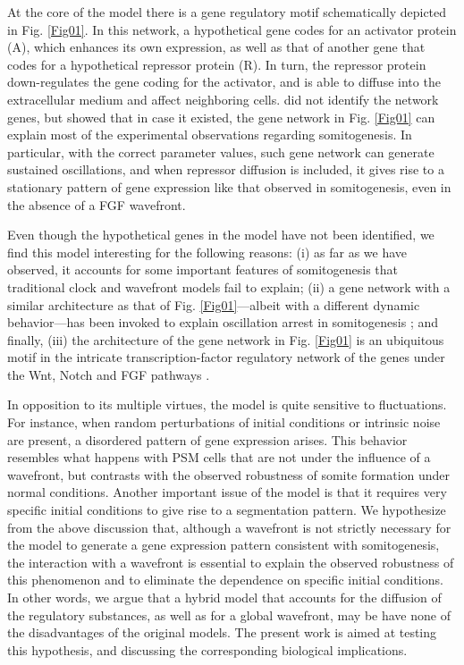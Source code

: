 \documentclass[11pt]{article}
\begin{document}
	At the core of the \citeauthor{Cotterell2015} model there is a gene regulatory
	motif schematically depicted in Fig. \ref{Fig01}. In this network, a
	hypothetical gene codes for an activator protein (A), which enhances its own
	expression, as well as that of another gene that codes for a hypothetical
	repressor protein (R). In turn, the repressor protein down-regulates the gene
	coding for the activator, and is able to diffuse into the extracellular medium
	and affect neighboring cells. \citeauthor{Cotterell2015} did not identify the
	network genes, but showed that in case it existed, the gene network in Fig.
	\ref{Fig01} can explain most of the experimental observations regarding
	somitogenesis. In particular, with the correct parameter values, such gene
	network can generate sustained oscillations, and when repressor diffusion is
	included, it gives rise to a stationary pattern of gene expression like that
	observed in somitogenesis, even in the absence of a FGF wavefront.
	
	Even though the hypothetical genes in the \citeauthor{Cotterell2015} model have
	not been identified, we find this model interesting for the following reasons:
	(i) as far as we have observed, it accounts for some important features of
	somitogenesis that traditional clock and wavefront models fail to explain; (ii)
	a gene network with a similar architecture as that of Fig. \ref{Fig01}---albeit
	with a different dynamic behavior---has been invoked to explain oscillation
	arrest in somitogenesis \citep{Santillan2008, Zavala2012}; and finally, (iii)
	the architecture of the gene network in Fig. \ref{Fig01} is an ubiquitous motif
	in the intricate transcription-factor regulatory network of the genes under the
	Wnt, Notch and FGF pathways \citep{Gibb2010, Zavala2012}.
	
	In opposition to its multiple virtues, the \citeauthor{Cotterell2015} model is
	quite sensitive to fluctuations. For instance, when random perturbations of
	initial conditions or intrinsic noise are present, a disordered pattern of gene
	expression arises. This behavior resembles what happens with PSM cells that are
	not under the influence of a wavefront, but contrasts with the observed
	robustness of somite formation under normal conditions. Another important issue 
	of the \citeauthor{Cotterell2015} model is that it requires very specific initial
	conditions to give rise to a segmentation pattern. We hypothesize from the
	above discussion that, although a wavefront is not strictly necessary for the
	\citeauthor{Cotterell2015} model to generate a gene expression pattern
	consistent with somitogenesis, the interaction with a wavefront is essential to
	explain the observed robustness of this phenomenon and to eliminate the dependence
	on specific initial conditions. In other words, we argue 
	that a hybrid model that accounts for the diffusion of the regulatory substances,
	as well as for a global wavefront, may be have none of the disadvantages of the
	original models. The present work is aimed at
	testing this hypothesis, and discussing the corresponding biological
	implications.
	
\end{document}
